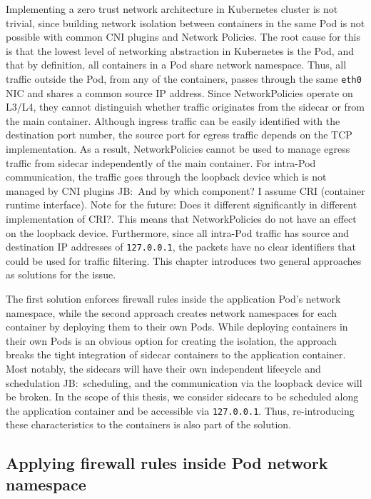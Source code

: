 \documentclass[english, 12pt, a4paper, sci, utf8, a-2b, online]{aaltothesis}
\newcommand{\mycomment}[3]{\textcolor{#1}{#2:~#3}}
\newcommand{\jb}[1]{\noindent\mycomment{aaltoRed}{JB}{#1}}
\begin{document}
Implementing a zero trust network architecture in Kubernetes cluster is not trivial, since building network isolation between containers in the same Pod is not possible with common CNI plugins and Network Policies.
The root cause for this is that the lowest level of networking abstraction in Kubernetes is the Pod, and that by definition, all containers in a Pod share network namespace.
Thus, all traffic outside the Pod, from any of the containers, passes through the same \texttt{eth0} NIC and shares a common source IP address.
Since NetworkPolicies operate on L3/L4, they cannot distinguish whether traffic originates from the sidecar or from the main container.
Although ingress traffic can be easily identified with the destination port number, the source port for egress traffic depends on the TCP implementation.
As a result, NetworkPolicies cannot be used to manage egress traffic from sidecar independently of the main container.
For intra-Pod communication, the traffic goes through the loopback device which is not managed by CNI plugins \jb{And by which component? I assume CRI (container runtime interface). Note for the future: Does it different significantly in different implementation of CRI?}.
This means that NetworkPolicies do not have an effect on the loopback device.
Furthermore, since all intra-Pod traffic has source and destination IP addresses of \texttt{127.0.0.1}, the packets have no clear identifiers that could be used for traffic filtering.
This chapter introduces two general approaches as solutions for the issue.

The first solution enforces firewall rules inside the application Pod's network namespace, while the second approach creates network namespaces for each container by deploying them to their own Pods.
While deploying containers in their own Pods is an obvious option for creating the isolation, the approach breaks the tight integration of sidecar containers to the application container.
Most notably, the sidecars will have their own independent lifecycle and schedulation \jb{scheduling}, and the communication via the loopback device will be broken.
In the scope of this thesis, we consider sidecars to be scheduled  along the application container and be accessible via \texttt{127.0.0.1}.
Thus, re-introducing these characteristics to the containers is also part of the solution.

\subsection{Applying firewall rules inside Pod network namespace}
\end{document}

